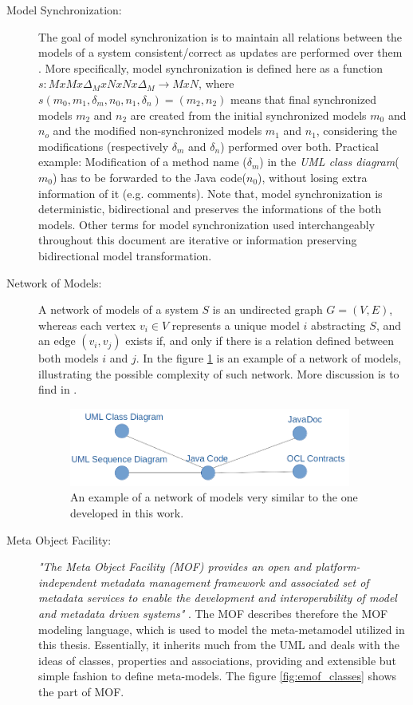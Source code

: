 \documentclass[tuberlin,cic,tc,english,noabntcite]{iiufrgs}
\begin{document}
\begin{description}
	\item[Model Synchronization:] The goal of model synchronization is to maintain all relations between the models of a system consistent/correct as updates are performed over them \cite{diskin2011model}. More specifically, model synchronization is defined here as a function $s : M x M x \Delta_M x N x N x \Delta_M \rightarrow M x N $, where $s(m_0,m_1,\delta_m,n_0,n_1,\delta_n) = (m_2,n_2)$ means that final synchronized models $m_2$ and $n_2$ are created from the initial synchronized models $m_0$ and $n_o$ and the modified non-synchronized models $m_1$ and $n_1$, considering the modifications (respectively $\delta_m$ and $\delta_n$) performed over both. Practical example: Modification of a method name ($\delta_m$) in the \emph{UML class diagram}($m_0$) has to be forwarded to the Java code($n_0$), without losing extra information of it (e.g. comments). Note that, model synchronization is deterministic, bidirectional and preserves the informations of the both models. Other terms for model synchronization used interchangeably throughout this document are iterative or information preserving bidirectional model transformation.

	\item[Network of Models:] A network of models of a system $S$ is an undirected graph $G = (V,E)$, whereas each vertex $v_i \in V$ represents a unique model $i$ abstracting $S$, and an edge $(v_i, v_j)$ exists if, and only if there is a relation defined between both models $i$ and $j$. In the figure \ref{fig:network_example_01} is an example of a network of models, illustrating the possible complexity of such network. More discussion is to find in \citet{mens2006taxonomy}.

	\begin{figure}[h]
	    \caption{An example of a network of models very similar to the one developed in this work.}
	    \begin{center}
	        \includegraphics[width=25em]{network_example_01}   
	    \end{center}
	    \label{fig:network_example_01}
	\end{figure}

	\item[Meta Object Facility:] \emph{"The Meta Object Facility (MOF) provides an open and platform-independent metadata management framework and associated set of metadata services to enable the development and interoperability of model and metadata driven systems"} \citep{omg2015meta}. The MOF describes therefore the MOF modeling language, which is used to model the meta-metamodel utilized in this thesis. Essentially, it inherits much from the UML and deals with the ideas of classes, properties and associations, providing and extensible but simple fashion to define meta-models. The figure \ref{fig:emof_classes} shows the part of MOF.


\end{description}
\end{document}
